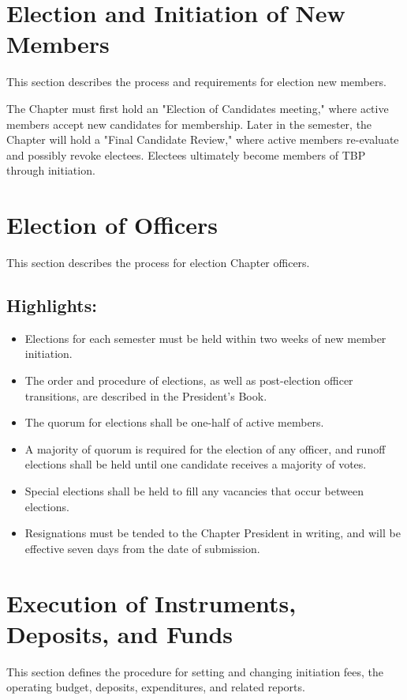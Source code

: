 \documentclass{article}
\begin{document}
	\section{Election and Initiation of New Members}
	This section describes the process and requirements for election new members.
	
	The Chapter must first hold an "Election of Candidates meeting," where active members accept new candidates for membership. Later in the semester, the Chapter will hold a "Final Candidate Review," where active members re-evaluate and possibly revoke electees. Electees ultimately become members of TBP through initiation.
	
	\section{Election of Officers}
	This section describes the process for election Chapter officers.
	\subsection*{Highlights:}
	\begin{itemize}
		\item Elections for each semester must be held within two weeks of new member initiation.
		\item The order and procedure of elections, as well as post-election officer transitions, are described in the President's Book.
		\item The quorum for elections shall be one-half of active members.
		\item A majority of quorum is required for the election of any officer, and runoff elections shall be held until one candidate receives a majority of votes.
		\item Special elections shall be held to fill any vacancies that occur between elections.
		\item Resignations must be tended to the Chapter President in writing, and will be effective seven days from the date of submission.
	\end{itemize}
	\section{Execution of Instruments, Deposits, and Funds}
	This section defines the procedure for setting and changing initiation fees, the operating budget, deposits, expenditures, and related reports.
	
\end{document}
